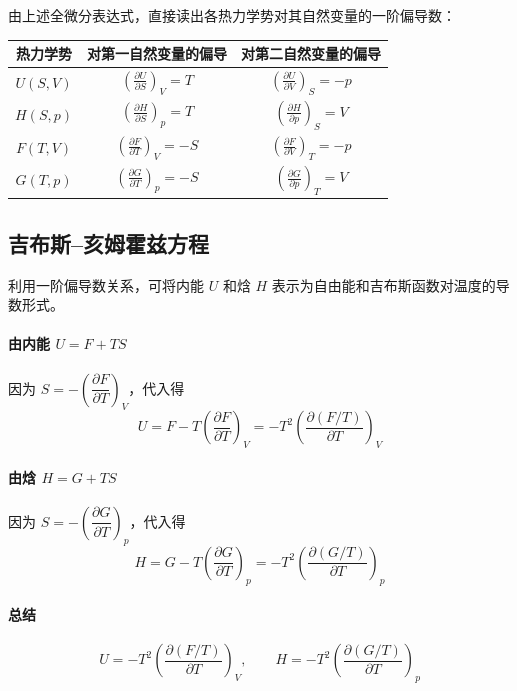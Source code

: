 \documentclass[UTF8]{ctexart}
\begin{document}
由上述全微分表达式，直接读出各热力学势对其自然变量的一阶偏导数：

\begin{center}
\begin{tabular}{c|c|c}
\hline
热力学势 & 对第一自然变量的偏导 & 对第二自然变量的偏导 \\
\hline
$U(S,V)$ & $\displaystyle\left(\frac{\partial U}{\partial S}\right)_V=T$ & $\displaystyle\left(\frac{\partial U}{\partial V}\right)_S=-p$ \\[8pt]
$H(S,p)$ & $\displaystyle\left(\frac{\partial H}{\partial S}\right)_p=T$ & $\displaystyle\left(\frac{\partial H}{\partial p}\right)_S=V$ \\[8pt]
$F(T,V)$ & $\displaystyle\left(\frac{\partial F}{\partial T}\right)_V=-S$ & $\displaystyle\left(\frac{\partial F}{\partial V}\right)_T=-p$ \\[8pt]
$G(T,p)$ & $\displaystyle\left(\frac{\partial G}{\partial T}\right)_p=-S$ & $\displaystyle\left(\frac{\partial G}{\partial p}\right)_T=V$ \\
\hline
\end{tabular}
\end{center}


\subsection{吉布斯--亥姆霍兹方程}

利用一阶偏导数关系，可将内能 $U$ 和焓 $H$ 表示为自由能和吉布斯函数对温度的导数形式。

\paragraph{由内能 $U=F+TS$}
因为 $S=-\left(\dfrac{\partial F}{\partial T}\right)_V$，代入得
\[
U=F-T\left(\frac{\partial F}{\partial T}\right)_V
=-T^2\left(\frac{\partial(F/T)}{\partial T}\right)_V
\]

\paragraph{由焓 $H=G+TS$}
因为 $S=-\left(\dfrac{\partial G}{\partial T}\right)_p$，代入得
\[
H=G-T\left(\frac{\partial G}{\partial T}\right)_p
=-T^2\left(\frac{\partial(G/T)}{\partial T}\right)_p
\]

\paragraph{总结}
\[
\boxed{U=-T^2\left(\frac{\partial(F/T)}{\partial T}\right)_V},\qquad
\boxed{H=-T^2\left(\frac{\partial(G/T)}{\partial T}\right)_p}
\]
\end{document}
